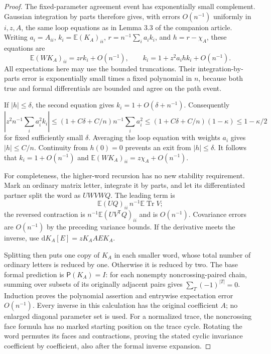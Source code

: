 \begin{proof}
The fixed-parameter agreement event has exponentially small complement.
Gaussian integration by parts therefore gives, with errors $O(n^{-1})$
uniformly in $i,z,A$, the same loop equations as in Lemma 3.3 of the
companion article.  Writing $a_i=A_{ii}$,
$k_i=\mathbb E(K_A)_{ii}$, $r=n^{-1}\sum_i a_i k_i$, and $h=r-\chi_A$,
these equations are
\[
 \mathbb E(WK_A)_{ii}=zr k_i+O(n^{-1}),\qquad
 k_i=1+z^2a_i h k_i+O(n^{-1}).
\]
All expectations here may use the bounded truncations.  Their
integration-by-parts error is exponentially small times a fixed
polynomial in $n$, because both true and formal differentials are
bounded and agree on the path event.

If $|h|\le\delta$, the second
equation gives $k_i=1+O(\delta+n^{-1})$.  Consequently
\[
 \left|z^2n^{-1}\sum_i a_i^2k_i\right|
 \le(1+C\delta+C/n)n^{-1}\sum_i a_i^2
 \le(1+C\delta+C/n)(1-\kappa)\le1-\kappa/2
\]
for fixed sufficiently small $\delta$.  Averaging the loop equation
with weights $a_i$ gives $|h|\le C/n$.  Continuity from $h(0)=0$
prevents an exit from $|h|\le\delta$.  It follows that
$k_i=1+O(n^{-1})$ and $\mathbb E(WK_A)_{ii}=z\chi_A+O(n^{-1})$.

For completeness, the higher-word recursion has no new stability
requirement.  Mark an ordinary matrix letter, integrate it by parts,
and let its differentiated partner split the word as $U\boxed W
V\boxed W Q$.  The leading term is
\[
 \mathbb E(UQ)_{ii}\,n^{-1}\mathbb E\operatorname{Tr}V;
\]
the reversed contraction is $n^{-1}\mathbb E(UV^{\mathsf T}Q)_{ii}$
and is $O(n^{-1})$.  Covariance errors are $O(n^{-1})$ by the preceding
variance bounds.  If the derivative meets the inverse, use
$\mathrm dK_A[E]=zK_AAEK_A$.

Splitting then puts one copy of $K_A$
in each smaller word, whose total number of ordinary letters is reduced
by one.  Otherwise it is reduced by two.  The base formal prediction
is $\mathsf P(K_A)=I$: for each nonempty noncrossing-paired chain,
summing over subsets of its originally adjacent pairs gives
$\sum_T(-1)^{|T|}=0$.  Induction proves the polynomial assertion and
entrywise expectation error $O(n^{-1})$.  Every inverse in this
calculation has the original coefficient $A$; no enlarged diagonal
parameter set is used.
For a normalized trace, the noncrossing face formula has no marked
starting position on the trace cycle. Rotating the word permutes its
faces and contractions, proving the stated cyclic invariance
coefficient by coefficient, also after the formal inverse expansion.


\end{proof}
